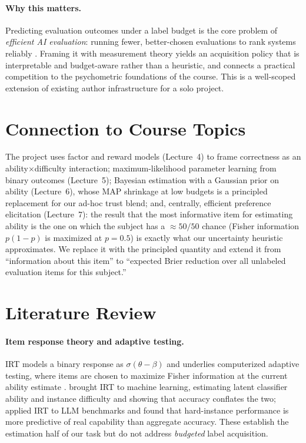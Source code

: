 \documentclass{article}
\begin{document}
\paragraph{Why this matters.} Predicting evaluation outcomes under a label budget
is the core problem of \emph{efficient AI evaluation}: running fewer, better-chosen
evaluations to rank systems reliably \citep{truong2025amortized}. Framing it with
measurement theory yields an acquisition policy that is interpretable and
budget-aware rather than a heuristic, and connects a practical competition to the
psychometric foundations of the course. This is a well-scoped extension of
existing author infrastructure for a solo project.

\section{Connection to Course Topics}

The project uses factor and reward models (Lecture~4) to frame correctness as an
ability$\times$difficulty interaction; maximum-likelihood parameter learning from
binary outcomes (Lecture~5); Bayesian estimation with a Gaussian prior on ability
(Lecture~6), whose MAP shrinkage at low budgets is a principled replacement for
our ad-hoc trust blend; and, centrally, efficient preference
elicitation (Lecture~7): the result that the most informative item for estimating
ability is the one on which the subject has a $\approx\!50/50$ chance
(Fisher information $p(1-p)$ is maximized at $p=0.5$) is exactly what our
uncertainty heuristic approximates. We replace it with the principled quantity and
extend it from ``information about this item'' to ``expected Brier reduction over
all unlabeled evaluation items for this subject.''

\section{Literature Review}

\paragraph{Item response theory and adaptive testing.} IRT models a binary
response as $\sigma(\theta - \beta)$ and underlies computerized adaptive testing,
where items are chosen to maximize Fisher information at the current ability
estimate \citep{lord1980, embretson2000}. \citet{martinezplumed2019} brought IRT
to machine learning, estimating latent classifier ability and instance difficulty
and showing that accuracy conflates the two; \citet{zhou2026} applied IRT to LLM
benchmarks and found that hard-instance performance is more predictive of real
capability than aggregate accuracy. These establish the estimation half of our
task but do not address \emph{budgeted} label acquisition.
\end{document}
